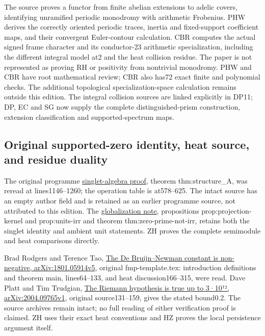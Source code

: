 \documentclass[
  10pt,
  a4paper,
]{article}
\begin{document}
The source proves a functor from finite abelian extensions to adelic
covers, identifying unramified periodic monodromy with arithmetic
Frobenius. PHW derives the correctly oriented periodic traces, inertia
and fixed-support coefficient maps, and their convergent Euler-contour
calculation. CBR computes the actual signed frame character and its
conductor-23 arithmetic specialization, including the different integral
model at2 and the heat collision residue. The paper is not represented
as proving RH or positivity from nontrivial monodromy. PHW and CBR have
root mathematical review; CBR also has72 exact finite and polynomial
checks. The additional topological specialization-space calculation
remains outside this edition. The integral collision sources are linked
explicitly in DP11; DP, EC and SG now supply the complete
distinguished-prism construction, extension classification and
supported-spectrum maps.

\subsection{Original supported-zero identity, heat source, and residue
duality}\label{original-supported-zero-identity-heat-source-and-residue-duality}

The original programme
\href{supporting_sources/17555345_11.tex\#L1146}{singlet-algebra proof},
theorem thm:structure\_A, was reread at lines1146--1260; the operation
table is at578--625. The intact source has an empty author field and is
retained as an earlier programme source, not attributed to this edition.
The \href{supporting_sources/globalization_note.tex}{globalization
note}, propositions prop:projection-kernel and prop:units-irr and
theorem thm:zero-prime-not-irr, retains both the singlet identity and
ambient unit statements. ZH proves the complete semimodule and heat
comparisons directly.

Brad Rodgers and Terence Tao,
\href{https://arxiv.org/abs/1801.05914v5}{The De Bruijn--Newman constant
is non-negative, arXiv:1801.05914v5}, original fmp-template.tex:
introduction definitions and theorem main, lines64--133, and heat
discussion166--315, were read. Dave Platt and Tim Trudgian,
\href{https://arxiv.org/abs/2004.09765v1}{The Riemann hypothesis is true
up to 3·10¹², arXiv:2004.09765v1}, original source131--159, gives the
stated bound0.2. The source archives remain intact; no full reading of
either verification proof is claimed. ZH uses their exact heat
conventions and HZ proves the local persistence argument itself.
\end{document}
